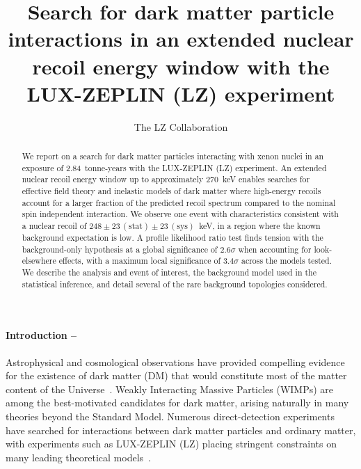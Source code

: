 

{
\title{Search for dark matter particle interactions in an extended nuclear recoil  energy window with the LUX-ZEPLIN (LZ) experiment}

\author{The LZ Collaboration}

\begin{abstract}
We report on a search for dark matter particles interacting with xenon nuclei in an exposure of 2.84~tonne-years with the LUX-ZEPLIN (LZ) experiment. 
An extended nuclear recoil energy window up to approximately 270~keV enables searches for effective field theory and inelastic models of dark matter where high-energy recoils account for a larger fraction of the predicted recoil spectrum compared to the nominal spin independent interaction.
We observe one event with characteristics consistent with a nuclear recoil of $248\pm23\,\mathrm{(stat)}\pm23\,\mathrm{(sys)}$~keV, in a region where the known background expectation is low. 
A profile likelihood ratio test finds tension with the background-only hypothesis at a global significance of 2.6$\sigma$ when accounting for look-elsewhere effects, with a maximum local significance of 3.4$\sigma$ across the models tested. 
We describe the analysis and event of interest, the background model used in the statistical inference, and detail several of the rare background topologies considered.  
\end{abstract}

\maketitle
}
\thispagestyle{fancy}

\paragraph{\label{sec:introduction}Introduction --}

Astrophysical and cosmological observations have provided compelling evidence for the existence of dark matter (DM) that would constitute most of the matter content of the Universe~\cite{1937ApJ,1970ApJ...159..379R,Clowe_2006,Planck2018VI}.
Weakly Interacting Massive Particles (WIMPs) are among the best-motivated candidates for dark matter, arising naturally in many theories beyond the Standard Model.
Numerous direct-detection experiments have searched for interactions between dark matter particles and ordinary matter, with experiments such as LUX-ZEPLIN (LZ) placing stringent constraints on many leading theoretical models~\cite{LZ:SR3_WS2024, XenonnT:WIMP-SI-2025,PandaX4T:WIMP-2025,DEAP3600:2026_WIMP,DarkSide-50:2018_532days,SuperCDMS:2018_WIMP,EDELWEISS:2019_WIMP,CRESST:2019_DM,PICO:2019_DM}.

